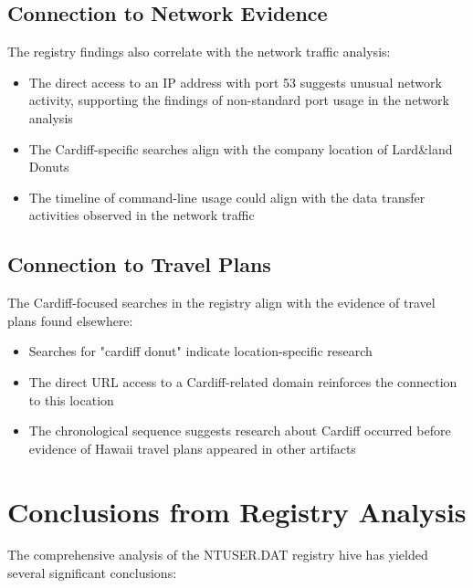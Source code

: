 \subsection{Connection to Network Evidence}
The registry findings also correlate with the network traffic analysis:

\begin{itemize}
    \item The direct access to an IP address with port 53 suggests unusual network activity, supporting the findings of non-standard port usage in the network analysis
    \item The Cardiff-specific searches align with the company location of Lard\&land Donuts
    \item The timeline of command-line usage could align with the data transfer activities observed in the network traffic
\end{itemize}

\subsection{Connection to Travel Plans}
The Cardiff-focused searches in the registry align with the evidence of travel plans found elsewhere:

\begin{itemize}
    \item Searches for "cardiff donut" indicate location-specific research
    \item The direct URL access to a Cardiff-related domain reinforces the connection to this location
    \item The chronological sequence suggests research about Cardiff occurred before evidence of Hawaii travel plans appeared in other artifacts
\end{itemize}

\section{Conclusions from Registry Analysis}
The comprehensive analysis of the NTUSER.DAT registry hive has yielded several significant conclusions:

